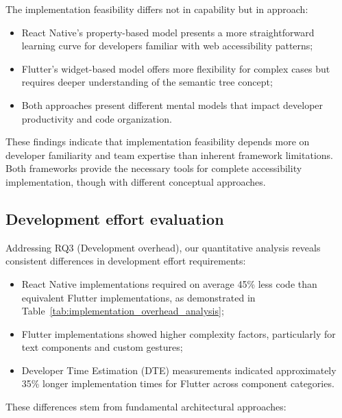 The implementation feasibility differs not in capability but in approach:

\begin{itemize}
    \item React Native's property-based model presents a more straightforward learning curve for developers familiar with web accessibility patterns;
    
    \item Flutter's widget-based model offers more flexibility for complex cases but requires deeper understanding of the semantic tree concept;
    
    \item Both approaches present different mental models that impact developer productivity and code organization.
\end{itemize}

These findings indicate that implementation feasibility depends more on developer familiarity and team expertise than inherent framework limitations. Both frameworks provide the necessary tools for complete accessibility implementation, though with different conceptual approaches.

\subsection{Development effort evaluation}
\label{subsec:development-effort}

Addressing RQ3 (Development overhead), our quantitative analysis reveals consistent differences in development effort requirements:

\begin{itemize}
    \item React Native implementations required on average 45\% less code than equivalent Flutter implementations, as demonstrated in Table~\ref{tab:implementation_overhead_analysis};
    
    \item Flutter implementations showed higher complexity factors, particularly for text components and custom gestures;
    
    \item Developer Time Estimation (DTE) measurements indicated approximately 35\% longer implementation times for Flutter across component categories.
\end{itemize}

These differences stem from fundamental architectural approaches:

